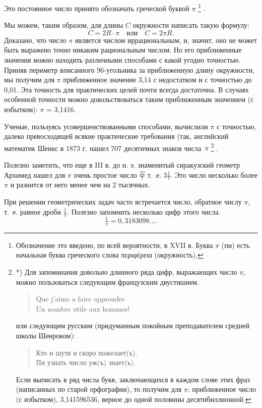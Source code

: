 \documentclass[oneside]{book}
\begin{document}
Это постоянное число принято обозначать греческой буквой $\pi$%
\footnote{Обозначение это введено, по всей вероятности, в XVII в.
Буква $\pi$ (пи) есть начальная буква греческого слова \textgreek{περιφέρεια} (окружность).}%
.

Мы можем, таким образом, для длины $C$ окружности написать такую формулу:
\[C=2R\cdot\pi
\quad\text{или}\quad
C=2\pi R.
\]
Доказано, что число $\pi$ является числом иррациональным, и, значит, оно не может быть выражено точно никаким рациональным числом.
Но его приближенные значения можно находить различными способами с какой угодно точностью.
Приняв периметр вписанного 96-угольника за приближенную длину окружности, мы получим для $\pi$ приближенное значение 3,14 с недостатком и с точностью до 0,01.
Эта точность для практических целей почти всегда достаточна.
В случаях особенной точности можно довольствоваться таким приближенным значением (с избытком):
$\pi$ = 3,1416.

Ученые, пользуясь усовершенствованными способами, вычислили $\pi$ с точностью, далеко превосходящей всякие практические требования (так, английский математик Шенкс в 1873 г.
нашел 707 десятичных знаков числа~$\pi$%
\footnote{*) Для запоминания довольно длинного ряда цифр, выражающих число $\pi$, можно пользоваться следующим французским двустишием.
\begin{verse}
Que j'aime a faire apprendre\\
Un nombre utile aux hommes!
\end{verse}
или следующим русским (придуманным покойным преподавателем средней школы Шенроком):
\begin{verse}
Кто и шутя и скоро пожелает(ъ).\\
Пи узнать число уж(ъ) знает(ъ).
\end{verse}
Если выписать в ряд числа букв, заключающихся в каждом слове этих фраз (написанных по старой орфографии), то получим для $\pi$:
приближенное число (с избытком), 3,141596536, верное до одной половины десятибиллионной.}%
.

Полезно заметить, что еще в III в.
до н. э. знаменитый сиракузский геометр Архимед нашел для $\pi$ очень простое число $\tfrac{22}7$ т.~е. $3\tfrac17$.
Это число несколько более $\pi$ и разнится от него менее чем на 2 тысячных.

При решении геометрических задач часто встречается число, обратное числу $\pi$, т.~е. равное дроби $\tfrac1\pi$.
Полезно запомнить несколько цифр этого числа.
\[\tfrac1\pi = 0{,}3183098\dots.\]
\end{document}

